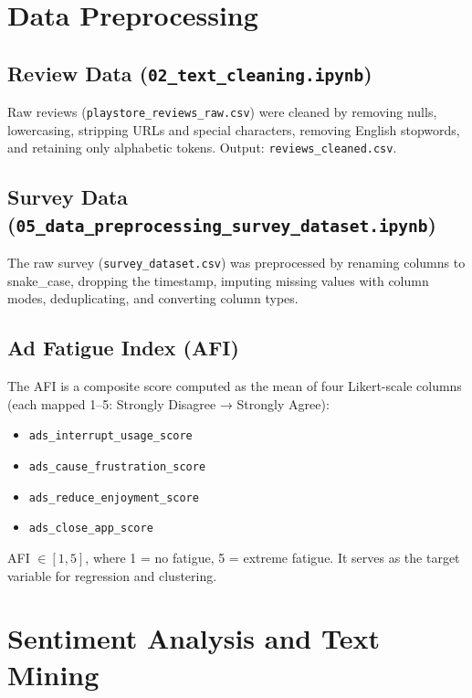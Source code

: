 \documentclass[12pt]{article}
\begin{document}
\section{Data Preprocessing}

\subsection{Review Data (\texttt{02\_text\_cleaning.ipynb})}

Raw reviews (\texttt{playstore\_reviews\_raw.csv}) were cleaned by removing nulls, lowercasing, stripping URLs and special characters, removing English stopwords, and retaining only alphabetic tokens. Output: \texttt{reviews\_cleaned.csv}.

\subsection{Survey Data (\texttt{05\_data\_preprocessing\_survey\_dataset.ipynb})}

The raw survey (\texttt{survey\_dataset.csv}) was preprocessed by renaming columns to snake\_case, dropping the timestamp, imputing missing values with column modes, deduplicating, and converting column types.

\subsection{Ad Fatigue Index (AFI)}

The AFI is a composite score computed as the mean of four Likert-scale columns (each mapped 1–5: Strongly Disagree → Strongly Agree):

\begin{itemize}
    \item \texttt{ads\_interrupt\_usage\_score}
    \item \texttt{ads\_cause\_frustration\_score}
    \item \texttt{ads\_reduce\_enjoyment\_score}
    \item \texttt{ads\_close\_app\_score}
\end{itemize}

AFI $\in [1, 5]$, where 1 = no fatigue, 5 = extreme fatigue. It serves as the target variable for regression and clustering.

\section{Sentiment Analysis and Text Mining}
\end{document}
